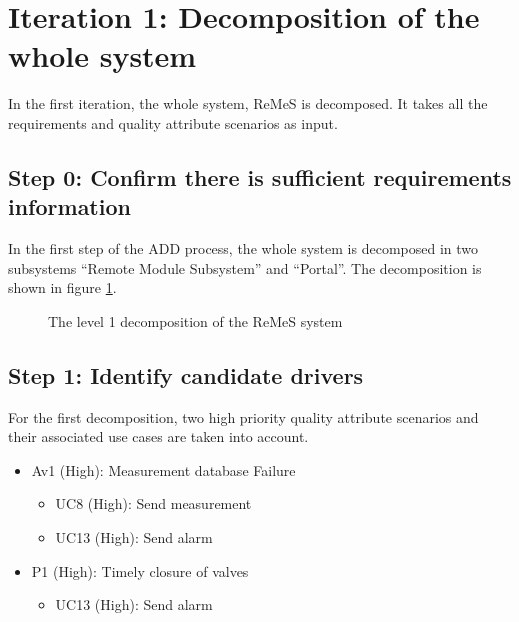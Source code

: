 \section{Iteration 1: Decomposition of the whole system}
\label{add:it1}

\npar In the first iteration, the whole system, ReMeS is decomposed. It takes
all the requirements and quality attribute scenarios as input.

\subsection{Step 0: Confirm there is sufficient requirements information} 


\npar In the first step of the ADD process, the whole system is decomposed in
two subsystems ``Remote Module Subsystem'' and ``Portal''. The decomposition is
shown in figure \ref{fig:dec/level-1}.

\begin{figure}[H]
	\begin{centering}
		\caption{The level 1 decomposition of the ReMeS system}
		\label{fig:dec/level-1}
	\end{centering}
\end{figure}

\subsection{Step 1: Identify candidate drivers}
\label{add:it1/drivers}

\npar For the first decomposition, two high priority quality attribute scenarios
and their associated use cases are taken into account. 

\begin{itemize}
 	\item Av1 (High): Measurement database Failure
 	\begin{itemize}
 		\item UC8 (High): Send measurement
 		\item UC13 (High): Send alarm 
 	\end{itemize}
  	\item P1 (High): Timely closure of valves
  	\begin{itemize}
  		\item UC13 (High): Send alarm 
  	\end{itemize}
\end{itemize}

